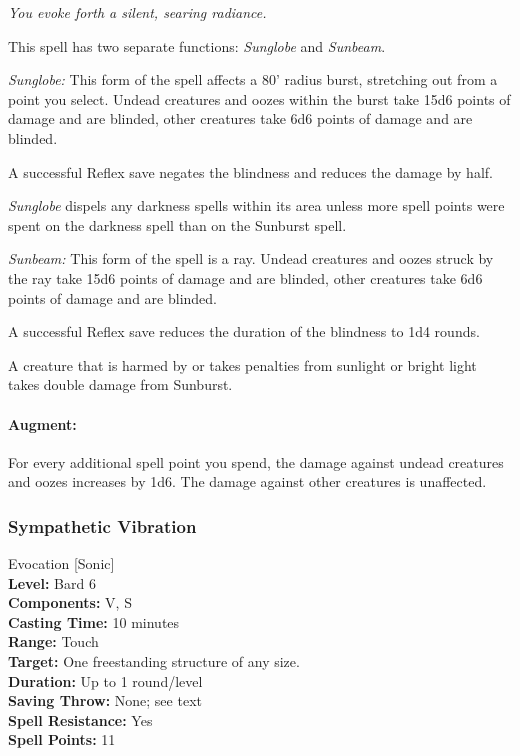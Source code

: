 \emph{You evoke forth a silent, searing radiance.} 

This spell has two separate functions: \emph{Sunglobe} and \emph{Sunbeam}.

\begin{list}{}{\leftmargin=1em}
 \item \emph{Sunglobe:} This form of the spell affects a 80' radius burst, stretching out from a point you select. Undead creatures and oozes within the burst take 15d6 points of damage and are blinded, other creatures take 6d6 points of damage and are blinded.

A successful Reflex save negates the blindness and reduces the damage by half.

\emph{Sunglobe} dispels any darkness spells within its area unless more spell points were spent on the darkness spell than on the Sunburst spell.
 \item \emph{Sunbeam:} This form of the spell is a ray. Undead creatures and oozes struck by the ray take 15d6 points of damage and are blinded, other creatures take 6d6 points of damage and are blinded.

A successful Reflex save reduces the duration of the blindness to 1d4 rounds.
\end{list} 
A creature that is harmed by or takes penalties from sunlight or bright light takes double damage from Sunburst.

\paragraph{Augment:} For every additional spell point you spend, the damage against undead creatures and oozes increases by 1d6.
The damage against other creatures is unaffected.

\subsubsection{Sympathetic Vibration}
\label{Spell:SympatheticVibration}
Evocation [Sonic]
\\ \textbf{Level:} Bard 6
\\ \textbf{Components:} V, S
\\ \textbf{Casting Time:} 10 minutes
\\ \textbf{Range:} Touch
\\ \textbf{Target:} One freestanding structure of any size.
\\ \textbf{Duration:} Up to 1 round/level
\\ \textbf{Saving Throw:} None; see text
\\ \textbf{Spell Resistance:} Yes
\\ \textbf{Spell Points:} 11

